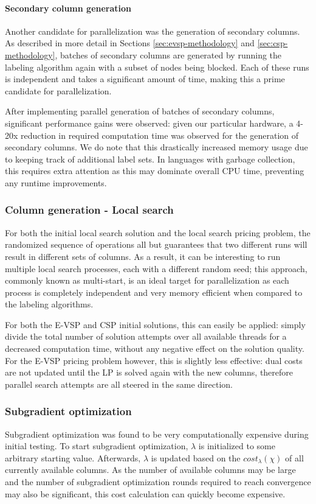 \documentclass[]{article}
\begin{document}
\paragraph{Secondary column generation}
Another candidate for parallelization was the generation of secondary columns. As described in more detail in Sections \ref{sec:evsp-methodology} and \ref{sec:csp-methodology}, batches of secondary columns are generated by running the labeling algorithm again with a subset of nodes being blocked. Each of these runs is independent and takes a significant amount of time, making this a prime candidate for parallelization.

After implementing parallel generation of batches of secondary columns, significant performance gains were observed: given our particular hardware, a 4-20x reduction in required computation time was observed for the generation of secondary columns. We do note that this drastically increased memory usage due to keeping track of additional label sets. In languages with garbage collection, this requires extra attention as this may dominate overall CPU time, preventing any runtime improvements.

\subsubsection{Column generation - Local search}
For both the initial local search solution and the local search pricing problem, the randomized sequence of operations all but guarantees that two different runs will result in different sets of columns. As a result, it can be interesting to run multiple local search processes, each with a different random seed; this approach, commonly known as multi-start, is an ideal target for parallelization as each process is completely independent and very memory efficient when compared to the labeling algorithms. 

For both the E-VSP and CSP initial solutions, this can easily be applied: simply divide the total number of solution attempts over all available threads for a decreased computation time, without any negative effect on the solution quality. For the E-VSP pricing problem however, this is slightly less effective: dual costs are not updated until the LP is solved again with the new columns, therefore parallel search attempts are all steered in the same direction.

\subsubsection{Subgradient optimization}
Subgradient optimization was found to be very computationally expensive during initial testing. To start subgradient optimization, $\lambda$ is initialized to some arbitrary starting value. Afterwards, $\lambda$ is updated based on the $cost_\lambda(\chi)$ of all currently available columns. As the number of available columns may be large and the number of subgradient optimization rounds required to reach convergence may also be significant, this cost calculation can quickly become expensive.
\end{document}
